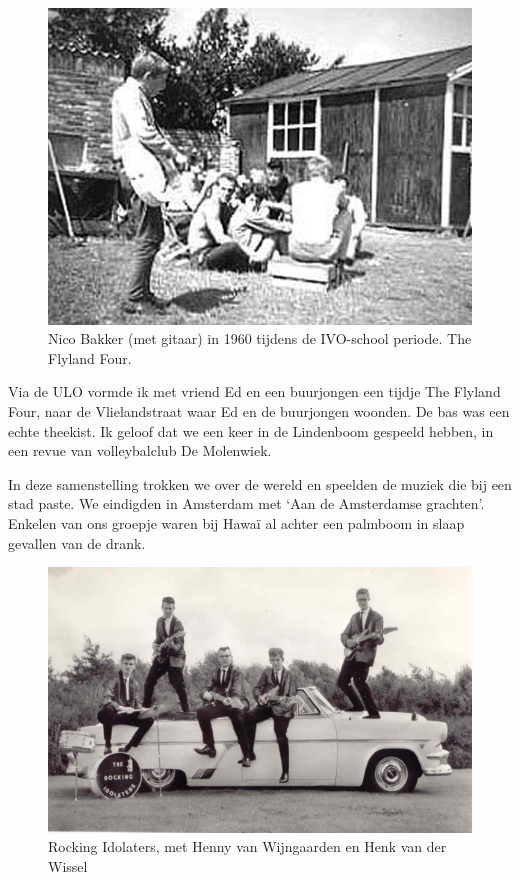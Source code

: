 \documentclass[12pt,twoside, openright]{memoir}
\begin{document}
\begin{figure}
\includegraphics[width=\textwidth]{img/ch25/nico}
\caption*{\footnotesize Nico Bakker (met gitaar) in 1960 tijdens de IVO-school periode. The Flyland Four.}
\end{figure}

Via de ULO vormde ik met vriend Ed en een buurjongen een tijdje The Flyland Four, naar de Vlielandstraat waar Ed en de buurjongen woonden. De bas was een echte theekist. Ik geloof dat we een keer in de Lindenboom gespeeld hebben, in een revue van volleybalclub De Molenwiek. 

In deze samenstelling trokken we over de wereld en speelden de muziek die bij een stad paste. We eindigden in Amsterdam met `Aan de Amsterdamse grachten'. Enkelen van ons groepje waren bij Hawaï al achter een palmboom in slaap gevallen van de drank. 

\begin{figure}
\includegraphics[width=\textwidth]{img/ch25/ri-2}
\caption*{\footnotesize Rocking Idolaters, met Henny van Wijngaarden en Henk van der Wissel}
\end{figure}  
\end{document}
